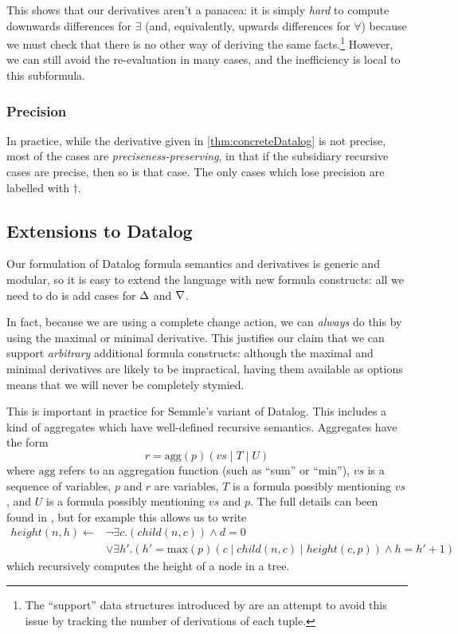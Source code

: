 This shows that our derivatives aren't a panacea: it is simply \emph{hard} to compute
downwards differences for $\exists$ (and, equivalently, upwards differences for
$\forall$) because we must check that there is no other way of deriving the same
facts.\footnote{The ``support'' data structures introduced by
  \autocite{gupta1993maintaining} are an attempt to avoid this issue by
  tracking the number of derivations of each tuple.} However, we can still avoid
the re-evaluation in many cases, and the inefficiency is local to this subformula.

\subsubsection{Precision}

In practice, while the derivative given in \cref{thm:concreteDatalog} is not
precise, most of the cases are \emph{preciseness-preserving}, in that if the
subsidiary recursive cases are precise, then so is that case. The only cases
which lose precision are labelled with $\dagger$.

\subsection{Extensions to Datalog}
\label{sec:extensions}

Our formulation of Datalog formula semantics and derivatives is 
generic and modular, so it is easy to extend the language with new
formula constructs: all we need to do is add cases for $\Delta$ and $\nabla$.

In fact, because we are using a complete change action, we can \emph{always} do this by using the maximal or
minimal derivative. This justifies our claim that we can support
\emph{arbitrary} additional formula constructs: although the maximal and minimal
derivatives are likely to be impractical, having them
available as options means that we will never be completely stymied.

This is important in practice for Semmle's variant of Datalog. This includes a
kind of aggregates which have well-defined recursive semantics. Aggregates have
the form
\begin{displaymath}
  r = \mathrm{agg}(p)(vs \mid T \mid U)
\end{displaymath}
where $\mathrm{agg}$ refers to an aggregation function (such as ``sum'' or
``min''), $vs$ is a sequence of variables, $p$ and $r$ are variables,
$T$ is a formula possibly mentioning $vs$, and $U$ is a formula
possibly mentioning $vs$ and $p$. The full details can been found in
\textcite{demoor2013aggregates}, but for example this allows us to write
\begin{align*}
  height(n, h) \leftarrow& \neg \exists c. (child(n, c)) \wedge d = 0\\
  &\vee \exists h'. (h' = \mathrm{max}(p)(c \mid child(n, c) \mid height(c, p)) \wedge h = h' + 1)
\end{align*}
which recursively computes the height of a node in a tree.

